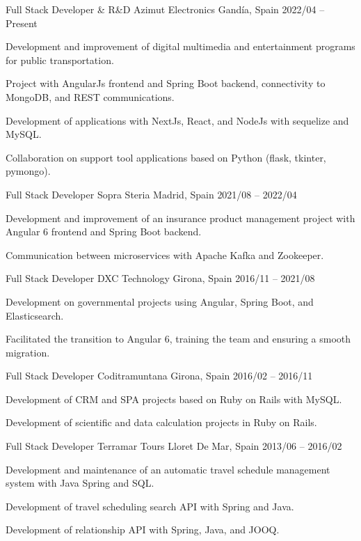 \documentclass[]{awesome-cv}
\begin{document}
\begin{cventries}
    \cventry
    {Full Stack Developer \& R\&D}
    {Azimut Electronics}
    {Gandía, Spain}
    {2022/04 – Present}
    {\begin{cvitems}
        \item {Development and improvement of digital multimedia and entertainment programs for public transportation.}
        \item {Project with AngularJs frontend and Spring Boot backend, connectivity to MongoDB, and REST communications.}
        \item {Development of applications with NextJs, React, and NodeJs with sequelize and MySQL.}
        \item {Collaboration on support tool applications based on Python (flask, tkinter, pymongo).}
    \end{cvitems}}

    \cventry
    {Full Stack Developer}
    {Sopra Steria}
    {Madrid, Spain}
    {2021/08 – 2022/04}
    {\begin{cvitems}
        \item {Development and improvement of an insurance product management project with Angular 6 frontend and Spring Boot backend.}
        \item {Communication between microservices with Apache Kafka and Zookeeper.}
    \end{cvitems}}

    \cventry
    {Full Stack Developer}
    {DXC Technology}
    {Girona, Spain}
    {2016/11 – 2021/08}
    {\begin{cvitems}
        \item {Development on governmental projects using Angular, Spring Boot, and Elasticsearch.}
        \item {Facilitated the transition to Angular 6, training the team and ensuring a smooth migration.}
    \end{cvitems}}

    \cventry
    {Full Stack Developer}
    {Coditramuntana}
    {Girona, Spain}
    {2016/02 – 2016/11}
    {\begin{cvitems}
        \item {Development of CRM and SPA projects based on Ruby on Rails with MySQL.}
        \item {Development of scientific and data calculation projects in Ruby on Rails.}
    \end{cvitems}}

    \cventry
    {Full Stack Developer}
    {Terramar Tours}
    {Lloret De Mar, Spain}
    {2013/06 – 2016/02}
    {\begin{cvitems}
        \item {Development and maintenance of an automatic travel schedule management system with Java Spring and SQL.}
        \item {Development of travel scheduling search API with Spring and Java.}
        \item {Development of relationship API with Spring, Java, and JOOQ.}
    \end{cvitems}}
    \vspace{10mm}
\end{cventries}
\end{document}

